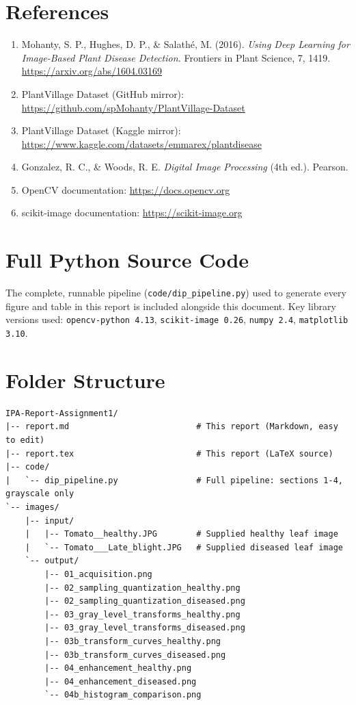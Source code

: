 \documentclass[11pt,a4paper]{article}
\begin{document}
\section*{References}
\begin{enumerate}
    \item Mohanty, S. P., Hughes, D. P., \& Salath\'e, M. (2016). \textit{Using Deep Learning for Image-Based Plant Disease Detection.} Frontiers in Plant Science, 7, 1419. \url{https://arxiv.org/abs/1604.03169}
    \item PlantVillage Dataset (GitHub mirror): \url{https://github.com/spMohanty/PlantVillage-Dataset}
    \item PlantVillage Dataset (Kaggle mirror): \url{https://www.kaggle.com/datasets/emmarex/plantdisease}
    \item Gonzalez, R. C., \& Woods, R. E. \textit{Digital Image Processing} (4th ed.). Pearson.
    \item OpenCV documentation: \url{https://docs.opencv.org}
    \item scikit-image documentation: \url{https://scikit-image.org}
\end{enumerate}

\appendix
\section{Full Python Source Code}

The complete, runnable pipeline (\texttt{code/dip\_pipeline.py}) used to generate every figure and table in this report is included alongside this document. Key library versions used: \texttt{opencv-python 4.13}, \texttt{scikit-image 0.26}, \texttt{numpy 2.4}, \texttt{matplotlib 3.10}.



\section{Folder Structure}

\begin{verbatim}
IPA-Report-Assignment1/
|-- report.md                          # This report (Markdown, easy to edit)
|-- report.tex                         # This report (LaTeX source)
|-- code/
|   `-- dip_pipeline.py                # Full pipeline: sections 1-4, grayscale only
`-- images/
    |-- input/
    |   |-- Tomato__healthy.JPG        # Supplied healthy leaf image
    |   `-- Tomato___Late_blight.JPG   # Supplied diseased leaf image
    `-- output/
        |-- 01_acquisition.png
        |-- 02_sampling_quantization_healthy.png
        |-- 02_sampling_quantization_diseased.png
        |-- 03_gray_level_transforms_healthy.png
        |-- 03_gray_level_transforms_diseased.png
        |-- 03b_transform_curves_healthy.png
        |-- 03b_transform_curves_diseased.png
        |-- 04_enhancement_healthy.png
        |-- 04_enhancement_diseased.png
        `-- 04b_histogram_comparison.png
\end{verbatim}
\end{document}
